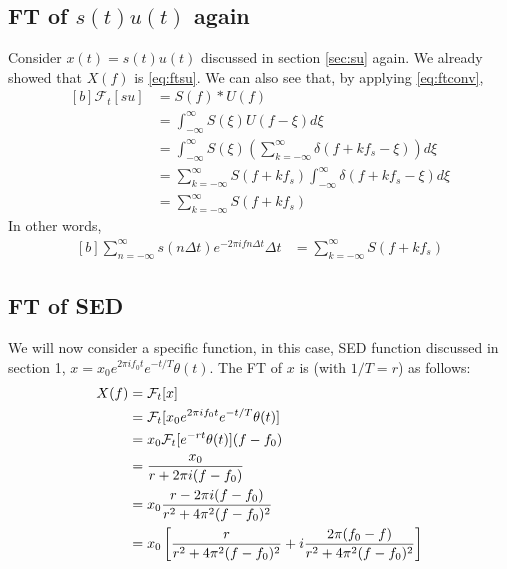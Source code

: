 \documentclass[letterpaper, 11pt]{article}
\newcommand{\fint}{\int_{-\infty}^{\infty}} %
\newcommand{\sed}[2]{#2_{0}e^{2\pi if_{0}#1}e^{-#1/T} \theta (#1)} %
\newcommand{\fsum}[1]{\sum_{#1 = -\infty}^{\infty}} %
\newcommand{\fourier}[2]{\mathcal{F}_{#1}[#2]} %
\newcommand{\conv}[4]{\fint #3(#2)#4(#1 - #2) d#2} %
\numberwithin{equation}{section}
\numberwithin{figure}{section}
\numberwithin{table}{section}
\begin{document}
\subsection{FT of \(s(t)u(t)\) again}
Consider \(x(t) = s(t)u(t)\) discussed in section \ref{sec:su} again. We already showed that \(X(f)\) is \eqref{eq:ftsu}. We can also see that, by applying \eqref{eq:ftconv}, 
\begin{equation}
	\begin{aligned}[b]
		\fourier{t}{su}
		&= S(f)*U(f)\\
		&= \conv{f}{\xi}{S}{U}\\
		&= \fint S(\xi) 
		   \left (\fsum{k} \delta (f + kf_{s}- \xi) \right ) d\xi\\
		&= \fsum{k} S(f + kf_{s}) \fint \delta (f + kf_{s} - \xi) d\xi\\
		&= \fsum{k} S(f + kf_{s}) 
	\end{aligned}
\end{equation}
In other words, 
\begin{equation}
	\begin{aligned}[b]
		\fsum{n} s(n \Delta t) e^{-2\pi ifn\Delta t} \Delta t 
			&= \fsum{k} S(f + kf_{s}) 
	\end{aligned}
\end{equation}

\subsection{FT of SED}
We will now consider a specific function, in this case, SED function discussed in section 1, \(x = \sed{t}{x}\). The FT of \(x\) is (with \(1/T = r\)) as follows:
\begin{equation}
	\begin{aligned}[b]
		X(f)	&= \fourier{t}{x}\\
			&= \fourier{t}{\sed{t}{x}}\\
			&= x_{0}\fourier{t}{e^{-rt} \theta (t)}(f - f_{0})\\
			&= \frac{x_{0}}{r + 2\pi i(f - f_{0})} \\
			\gdef\temp{r^2 + 4\pi^{2}(f - f_{0})^2} %
			&= x_{0}\frac{r - 2\pi i(f - f_{0})}{\temp}\\
			&= x_{0}\left[\frac{r}{\temp} + i\frac{2\pi(f_{0} - f)}{\temp} \right]
	\end{aligned}
\end{equation}

\clearpage
\end{document}
